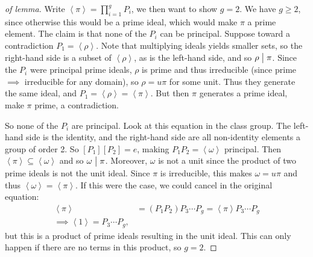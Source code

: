 \begin{proof}[of lemma]

Write \(\left\langle{ \pi }\right\rangle= \prod_{i=1}^g P_i\), we then
want to show \(g=2\). We have \(g\geq 2\), since otherwise this would be
a prime ideal, which would make \(\pi\) a prime element. The claim is
that none of the \(P_i\) can be principal. Suppose toward a
contradiction \(P_1 = \left\langle{ \rho }\right\rangle\). Note that
multiplying ideals yields smaller sets, so the right-hand side is a
subset of \(\left\langle{ \rho }\right\rangle\), as is the left-hand
side, and so \(\rho \bigm|\pi\). Since the \(P_i\) were principal prime
ideals, \(\rho\) is prime and thus irreducible (since prime \(\implies\)
irreducible for any domain), so \(\rho = u \pi\) for some unit. Thus
they generate the same ideal, and
\(P_1 = \left\langle{ \rho }\right\rangle = \left\langle{ \pi }\right\rangle\).
But then \(\pi\) generates a prime ideal, make \(\pi\) prime, a
contradiction.

So none of the \(P_i\) are principal. Look at this equation in the class
group. The left-hand side is the identity, and the right-hand side are
all non-identity elements a group of order 2. So \([P_1][P_2] = e\),
making \(P_1 P_2 = \left\langle{ \omega }\right\rangle\) principal. Then
\(\left\langle{ \pi }\right\rangle\subseteq \left\langle{ \omega }\right\rangle\)
and so \(\omega \bigm|\pi\). Moreover, \(\omega\) is not a unit since
the product of two prime ideals is not the unit ideal. Since \(\pi\) is
irreducible, this makes \(\omega= u \pi\) and thus
\(\left\langle{ \omega }\right\rangle = \left\langle{ \pi }\right\rangle\).
If this were the case, we could cancel in the original equation:
\begin{align*}
\left\langle{ \pi }\right\rangle &= (P_1 P_2)P_3 \cdots P_g = \left\langle{ \pi }\right\rangle P_3 \cdots P_g   \\
\implies \left\langle{ 1 }\right\rangle = P_3 \cdots P_g 
,\end{align*}
but this is a product of prime ideals resulting in the unit ideal. This
can only happen if there are no terms in this product, so \(g=2\).

\end{proof}


